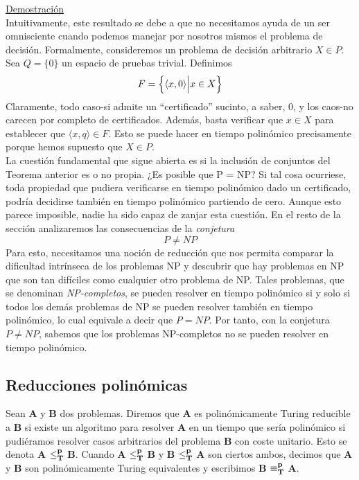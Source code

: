 \underline{Demostración}\\
Intuitivamente, este resultado se debe a que no necesitamos ayuda de un ser omnisciente cuando podemos manejar por nosotros mismos el problema de decisión. Formalmente, consideremos un problema de decisión arbitrario $X \in P$. Sea $Q = \{0\}$ un espacio de pruebas trivial. Definimos
\[ F = \Bigl\{ \langle x, 0 \rangle \Bigl| x \in X \Bigl\} \]
Claramente, todo caso-si admite un ``certificado'' sucinto, a saber, 0, y los caos-no carecen por completo de certificados. Además, basta verificar que $x \in X$ para establecer que $\langle x, q \rangle \in F$. Esto se puede hacer en tiempo polinómico precisamente porque hemos supuesto que $X \in P$.\\
La cuestión fundamental que sigue abierta es si la inclusión de conjuntos del Teorema anterior es o no propia. ¿Es posible que P = NP? Si tal cosa ocurriese, toda propiedad que pudiera verificarse en tiempo polinómico dado un certificado,  podría decidirse también en tiempo polinómico partiendo de cero. Aunque esto parece imposible, nadie ha sido capaz de zanjar esta cuestión. En el resto de la sección analizaremos las consecuencias de la \emph{conjetura}
\[ P \neq NP \]
Para esto, necesitamos una noción de reducción que nos permita comparar la dificultad intrínseca de los problemas NP y descubrir que hay problemas en NP que son tan difíciles como cualquier otro problema de NP. Tales problemas, que se denominan \emph{NP-completos}, se pueden resolver en tiempo polinómico si y solo si todos los demás problemas de NP se pueden resolver también en tiempo polinómico, lo cual equivale a decir que $P = NP$. Por tanto, con la conjetura $P \neq NP$, sabemos que los problemas NP-completos no se pueden resolver en tiempo polinómico.\\

\subsection{Reducciones polinómicas}

\begin{fondo}
Sean \textbf{A} y \textbf{B} dos problemas. Diremos que \textbf{A} es polinómicamente Turing reducible a \textbf{B} si existe un algoritmo para resolver \textbf{A} en un tiempo que sería polinómico si pudiéramos resolver casos arbitrarios del problema \textbf{B} con coste unitario. Esto se denota \textbf{A} $\bf{\leq} _{T}^p$ \textbf{B}. Cuando \textbf{A} $\bf{\leq} _{T}^p$ \textbf{B} y \textbf{B} $\bf{\leq} _{T}^p$ \textbf{A} son ciertos ambos, decimos que \textbf{A} y \textbf{B} son polinómicamente Turing equivalentes y escribimos \textbf{B} $\bf{\equiv} _{T}^p$ \textbf{A}.
\end{fondo}

